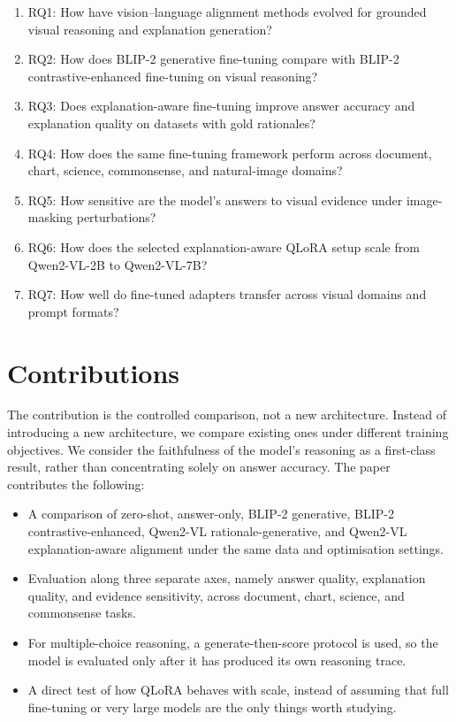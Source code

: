 \documentclass[12pt,bibliography=totoc,listof=totoc,BCOR=5mm,DIV=12,oneside,open=any]{scrbook}
\begin{document}
\begin{enumerate}
    \item RQ1: How have vision--language alignment methods evolved for grounded visual reasoning and explanation generation?
    \item RQ2: How does BLIP-2 generative fine-tuning compare with BLIP-2 contrastive-enhanced fine-tuning on visual reasoning?
    \item RQ3: Does explanation-aware fine-tuning improve answer accuracy and explanation quality on datasets with gold rationales?
    \item RQ4: How does the same fine-tuning framework perform across document, chart, science, commonsense, and natural-image domains?
    \item RQ5: How sensitive are the model's answers to visual evidence under image-masking perturbations?
    \item RQ6: How does the selected explanation-aware QLoRA setup scale from Qwen2-VL-2B to Qwen2-VL-7B?
    \item RQ7: How well do fine-tuned adapters transfer across visual domains and prompt formats?
\end{enumerate}

\section{Contributions}
The contribution is the controlled comparison, not a new architecture.
Instead of introducing a new architecture, we compare existing ones under different training objectives.
We consider the faithfulness of the model's reasoning as a first-class result, rather than concentrating solely on answer accuracy.
The paper contributes the following:

\begin{itemize}
    \item A comparison of zero-shot, answer-only, BLIP-2 generative, BLIP-2 contrastive-enhanced, Qwen2-VL rationale-generative, and Qwen2-VL explanation-aware alignment under the same data and optimisation settings.
    \item Evaluation along three separate axes, namely answer quality, explanation quality, and evidence sensitivity, across document, chart, science, and commonsense tasks.
    \item For multiple-choice reasoning, a generate-then-score protocol is used, so the model is evaluated only after it has produced its own reasoning trace.
    \item A direct test of how QLoRA behaves with scale, instead of assuming that full fine-tuning or very large models are the only things worth studying.
\end{itemize}
\end{document}

